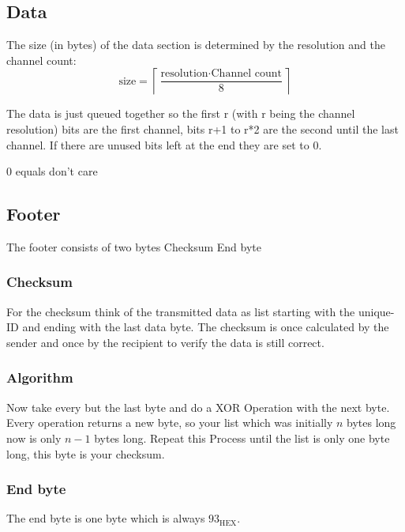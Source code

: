 \documentclass{report}
\begin{document}
  \subsection{Data}
    The size (in bytes) of the data section is determined by
    the resolution and the channel count:
    \begin{equation}
        \text{size} = \left\lceil{\frac{\text{resolution} \cdot \text{Channel count}}{8}} \right\rceil
    \end{equation}

   The data is just queued together so the first r (with r being the channel
   resolution) bits are the first channel, bits r+1 to r*2 are the second
   until the last channel. If there are unused bits left at the end they are
   set to 0.

   0 equals don't care

  \subsection{Footer}
    The footer consists of two bytes Checksum End byte

    \subsubsection{Checksum}
     For the checksum think of the transmitted data as list starting with the
     unique-ID and ending with the last data byte. The checksum is once
     calculated by the sender and once by the recipient to verify the data is
     still correct.

    \subsubsection{Algorithm}
     Now take every but the last byte and do a XOR Operation with the next byte.
     Every operation returns a new byte, so your list which was initially $n$
     bytes long now is only $n-1$ bytes long. Repeat this Process until the list
     is only one byte long, this byte is your checksum.

    \subsubsection{End byte}
     The end byte is one byte which is always $93_\text{HEX}$.
\end{document}
